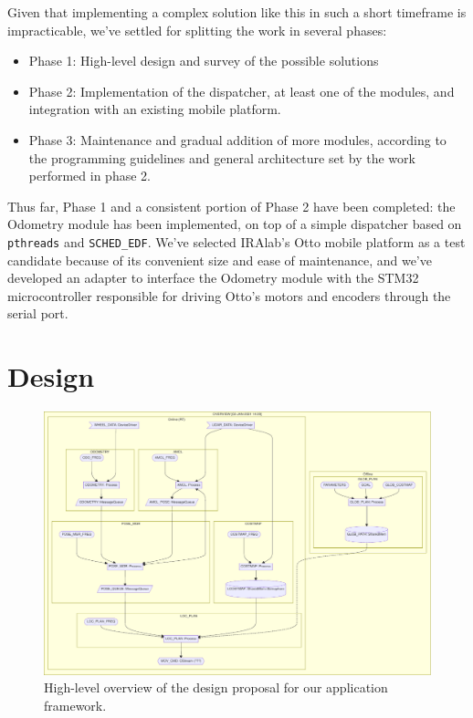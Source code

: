 \documentclass[a4paper,12pt]{report}
\begin{document}
Given that implementing a complex solution like this in such a short timeframe is impracticable, we've settled for splitting the work in several phases:
\begin{itemize}
  \item Phase 1: High-level design and survey of the possible solutions
  \item Phase 2: Implementation of the dispatcher, at least one of the modules, and integration with an existing mobile platform.
  \item Phase 3: Maintenance and gradual addition of more modules, according to the programming guidelines and general architecture set by the work performed in phase 2.
\end{itemize}

Thus far, Phase 1 and a consistent portion of Phase 2 have been completed: the Odometry module has been implemented, on top of a simple dispatcher based on \texttt{pthreads} and \texttt{SCHED\_EDF}. We've selected IRAlab's Otto \cite{fdila-bs-otto} mobile platform as a test candidate because of its convenient size and ease of maintenance, and we've developed an adapter to interface the Odometry module with the STM32 microcontroller responsible for driving Otto's motors and encoders through the serial port.

\section{Design}

\begin{figure}[H]
    \centering
    \includegraphics[width=\textwidth]{img/overview.pdf}
    \caption{High-level overview of the design proposal for our application framework.}
\end{figure}
\end{document}
